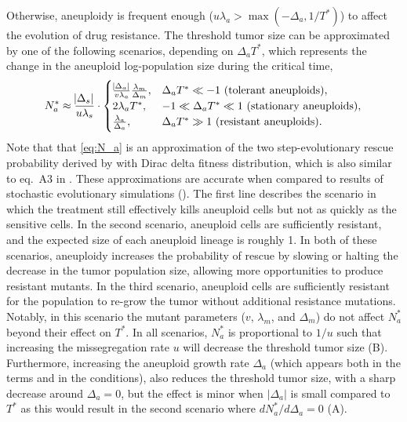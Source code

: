 \documentclass[12pt]{extarticle}
\begin{document}
Otherwise, aneuploidy is frequent enough ($u\lambda_a > \max{\left(-\Delta_a, 1/T^*\right)}$) to affect the evolution of drug resistance. 
The threshold tumor size can be approximated by one of the following scenarios, depending on $\Delta_a T^*$, which represents the change in the aneuploid log-population size during the critical time,
\begin{equation}  \label{eq:N_a}
\begin{aligned}
N_a^* \approx 
  \frac{\abs{\Delta_s}}{u\lambda_s} \cdot \begin{cases}
    \frac{\abs{\Delta_a}}{v\lambda_a}  \frac{\lambda_m}{\Delta_m} ,&
  \Delta_a T^* \ll -1 \text{ (tolerant aneuploids)},\\ 
  2\lambda_a T^* ,&
  -1 \ll \Delta_a T^* \ll 1  \text{ (stationary aneuploids)},\\ 
  \frac{\lambda_a}{\Delta_a} ,&
   \Delta_a T^* \gg 1 \text{ (resistant aneuploids)}.
  \end{cases}
\end{aligned}
\end{equation}
Note that that \cref{eq:N_a} is an approximation of the two step-evolutionary rescue probability derived by \citet{osmond_genetic_2020} with Dirac delta fitness distribution, which is also similar to eq.~A3 in \citep{iwasa2004evolutionary}. %
These approximations are accurate when compared to results of stochastic evolutionary simulations (). 
The first line describes the scenario in which the treatment still effectively kills aneuploid cells but not as quickly as the sensitive cells. 
In the second scenario, aneuploid cells are sufficiently resistant, and the expected size of each aneuploid lineage is roughly 1.
In both of these scenarios, aneuploidy increases the probability of rescue by slowing or halting the decrease in the tumor population size, allowing more opportunities to produce resistant mutants. 
In the third scenario, aneuploid cells are sufficiently resistant for the population to re-grow the tumor without additional resistance mutations.
Notably, in this scenario the mutant parameters ($v$, $\lambda_m$, and $\Delta_m$) do not affect $N_a^*$ beyond their effect on $T^*$.
In all scenarios, $N_a^*$ is proportional to $1/u$ such that increasing the missegregation rate $u$ will decrease the threshold tumor size (B).
Furthermore, increasing the aneuploid growth rate $\Delta_a$ (which appears both in the terms and in the conditions), also reduces the threshold tumor size, with a sharp decrease around $\Delta_a=0$, but the effect is minor when $|\Delta_a|$ is small compared to $T^*$ as this would result in the second scenario where  $dN_a^*/d\Delta_a=0$ (A). 
\end{document}

